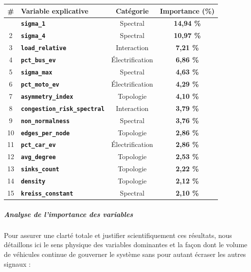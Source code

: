 \documentclass[10pt, a4paper]{article}
\newcounter{none}
\begin{document}
{\def\LTcaptype{none} %
\begin{longtable}[]{@{}clcc@{}}
\toprule\noalign{}
\# & Variable explicative & Catégorie & Importance (\%) \\
\midrule\noalign{}
\endhead
\bottomrule\noalign{}
\endlastfoot
1 & \textbf{\texttt{sigma\_1}} & Spectral & \textbf{14,94 \%} \\
2 & \textbf{\texttt{sigma\_4}} & Spectral & \textbf{10,97 \%} \\
3 & \textbf{\texttt{load\_relative}} & Interaction & \textbf{7,21 \%} \\
4 & \textbf{\texttt{pct\_bus\_ev}} & Électrification & \textbf{6,86
\%} \\
5 & \textbf{\texttt{sigma\_max}} & Spectral & \textbf{4,63 \%} \\
6 & \textbf{\texttt{pct\_moto\_ev}} & Électrification & \textbf{4,29
\%} \\
7 & \textbf{\texttt{asymmetry\_index}} & Topologie & \textbf{4,10 \%} \\
8 & \textbf{\texttt{congestion\_risk\_spectral}} & Interaction &
\textbf{3,79 \%} \\
9 & \textbf{\texttt{non\_normalness}} & Spectral & \textbf{3,76 \%} \\
10 & \textbf{\texttt{edges\_per\_node}} & Topologie & \textbf{2,86
\%} \\
11 & \textbf{\texttt{pct\_car\_ev}} & Électrification & \textbf{2,86
\%} \\
12 & \textbf{\texttt{avg\_degree}} & Topologie & \textbf{2,53 \%} \\
13 & \textbf{\texttt{sinks\_count}} & Topologie & \textbf{2,22 \%} \\
14 & \textbf{\texttt{density}} & Topologie & \textbf{2,12 \%} \\
15 & \textbf{\texttt{kreiss\_constant}} & Spectral & \textbf{2,10 \%} \\
\end{longtable}
}

\subparagraph{Analyse de l'importance des
variables}\label{analyse-de-limportance-des-variables}

Pour assurer une clarté totale et justifier scientifiquement ces
résultats, nous détaillons ici le sens physique des variables dominantes
et la façon dont le volume de véhicules continue de gouverner le système
sans pour autant écraser les autres signaux :
\end{document}
